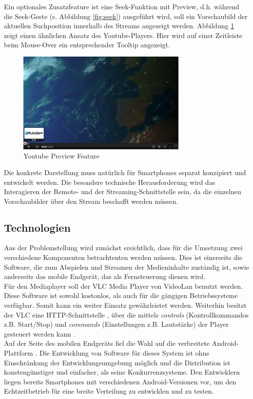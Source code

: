 \documentclass[a4paper,12pt]{article}
\begin{document}
Ein optionales Zusatzfeature ist eine Seek-Funktion mit Preview, d.h. während die Seek-Geste (s. Abbildung \ref{fig:seek}) ausgeführt wird, soll ein Vorschaubild der aktuellen Suchposition innerhalb des Streams angezeigt werden. Abbildung \ref{fig:youtube} zeigt einen ähnlichen Ansatz des Youtube-Players. Hier wird auf einer Zeitleiste beim Mouse-Over ein entsprechender Tooltip angezeigt.

\begin{figure}[H]
\centering
\includegraphics[width=0.75\textwidth]{youtube.png}
\caption{Youtube Preview Feature}
\label{fig:youtube}
\end{figure}

Die konkrete Darstellung muss natürlich für Smartphones separat konzipiert und entwickelt werden. Die besondere technische Herausforderung wird das Interagieren der Remote- und der Streaming-Schnittstelle sein, da die einzelnen Vorschaubilder über den Stream beschafft werden müssen.

\subsection*{Technologien}
Aus der Problemstellung wird zunächst ersichtlich, dass für die Umsetzung zwei verschiedene Komponenten betrachtenten werden müssen. Dies ist einerseits die Software, die zum Abspielen und Streamen der Medieninhalte zuständig ist, sowie anderseits das mobile Endgerät, das als Fernsteuerung dienen wird. \\
Für den Mediaplayer soll der VLC Media Player von VideoLan \cite{VLC} benutzt werden. Diese Software ist sowohl kostonlos, als auch für die gängigen Betriebssysteme verfügbar. Somit kann ein weiter Einsatz gewährleistet werden. Weiterhin besitzt der VLC eine HTTP-Schnittstelle \cite{VLC:WebInterface}, über die mittels \textit{controls} (Kontrollkommandos z.B. Start/Stop) und \textit{commands} (Einstellungen z.B. Lautstärke) der Player gesteuert werden kann \cite{VLC:HowTo}. \\
Auf der Seite des mobilen Endgeräts fiel die Wahl auf die verbreitete Android-Plattform \cite{Android}. Die Entwicklung von Software für dieses System ist ohne Einschränkung der Entwicklungsumgebung möglich und die Distribution ist konstengünstiger und einfacher, als seine Konkurrenzsysteme. Den Entwicklern liegen bereits Smartphones mit verschiedenen Android-Versionen vor, um den Echtzeitbetrieb für eine breite Verteilung zu entwicklen und zu testen.
\end{document}
